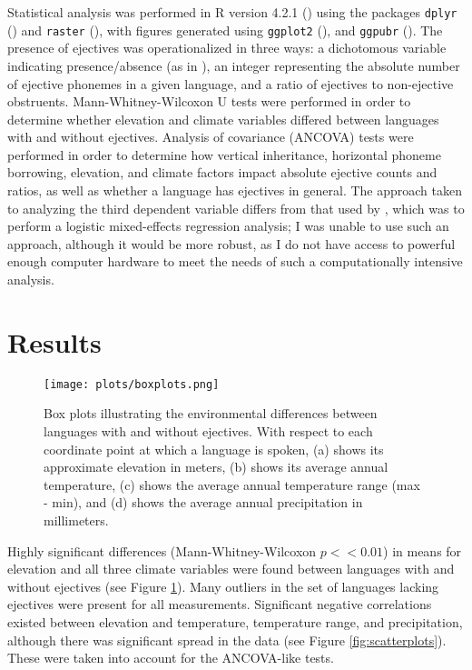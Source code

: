 \documentclass{article}
\begin{document}
Statistical analysis was performed in R version 4.2.1 (\cite{R}) using the packages \texttt{dplyr} (\cite{dplyr}) and \texttt{raster} (\cite{raster}), with figures generated using \texttt{ggplot2} (\cite{ggplot2}), and \texttt{ggpubr} (\cite{ggpubr}). The presence of ejectives was operationalized in three ways: a dichotomous variable indicating presence/absence (as in \cite{everett2013}), an integer representing the absolute number of ejective phonemes in a given language, and a ratio of ejectives to non-ejective obstruents. Mann-Whitney-Wilcoxon U tests were performed in order to determine whether elevation and climate variables differed between languages with and without ejectives. Analysis of covariance (ANCOVA) tests were performed in order to determine how vertical inheritance, horizontal phoneme borrowing, elevation, and climate factors impact absolute ejective counts and ratios, as well as whether a language has ejectives in general. The approach taken to analyzing the third dependent variable differs from that used by \textcite{urban2021}, which was to perform a logistic mixed-effects regression analysis; I was unable to use such an approach, although it would be more robust, as I do not have access to powerful enough computer hardware to meet the needs of such a computationally intensive analysis. 

\section{Results}

\begin{figure}
	\texttt{[image: plots/boxplots.png]}
	\caption{Box plots illustrating the environmental differences between languages with and without ejectives. With respect to each coordinate point at which a language is spoken, (a) shows its approximate elevation in meters, (b) shows its average annual temperature, (c) shows the average annual temperature range (max - min), and (d) shows the average annual precipitation in millimeters.}
	\label{fig:boxplots}
\end{figure}

Highly significant differences (Mann-Whitney-Wilcoxon $p << 0.01$) in means for elevation and all three climate variables were found between languages with and without ejectives (see Figure \ref{fig:boxplots}). Many outliers in the set of languages lacking ejectives were present for all measurements. Significant negative correlations existed between elevation and temperature, temperature range, and precipitation, although there was significant spread in the data (see Figure \ref{fig:scatterplots}). These were taken into account for the ANCOVA-like tests.
\end{document}
